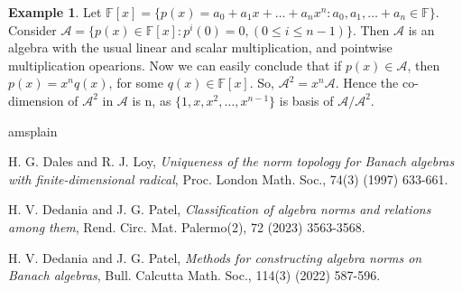 \documentclass{amsart}
\theoremstyle{definition}
\newtheorem{exam}[thm]{Example}
\numberwithin{equation}{section}
\begin{document}
\begin{exam}
	Let $\mathbb{F}[x]= \{p(x)= a_0+ a_1x+ \ldots+ a_n x^n : a_0, a_1, \ldots+ a_n \in \mathbb{F}\}$. Consider $\mathcal{A}= \{p(x) \in \mathbb{F}[x] : p^{i}(0)=0, (0 \leq i \leq n-1) \}$. Then $\mathcal{A}$ is an algebra with the usual linear and scalar multiplication, and pointwise multiplication opearions. Now we can easily conclude that if $p(x) \in \mathcal{A}$, then $p(x)=x^n q(x)$, for some $q(x) \in \mathbb{F}[x]$. So, $\mathcal{A}^2= x^n \mathcal{A}$. Hence the co-dimension of $\mathcal{A}^2$ in $\mathcal{A}$ is n, as $\{1,x, x^2, \ldots, x^{n-1}\}$ is basis of $\mathcal{A}/\mathcal{A}^2$.
\end{exam}
\begin{thebibliography}{amsplain}
%		
		
	 H. G. Dales and R. J. Loy, \emph{Uniqueness of the norm topology for Banach algebras with finite-dimensional radical}, Proc. London Math. Soc., 74(3) (1997) 633-661.

		 H. V. Dedania and J. G. Patel, \emph{Classification of algebra norms and relations among them}, Rend. Circ. Mat. Palermo(2), 72 (2023) 3563-3568. 
		
		 H. V. Dedania and J. G. Patel, \emph{Methods for constructing algebra norms on Banach algebras}, Bull. Calcutta Math. Soc., 114(3) (2022) 587-596.
		

		
%		
	\end{thebibliography}
	
\end{document}
